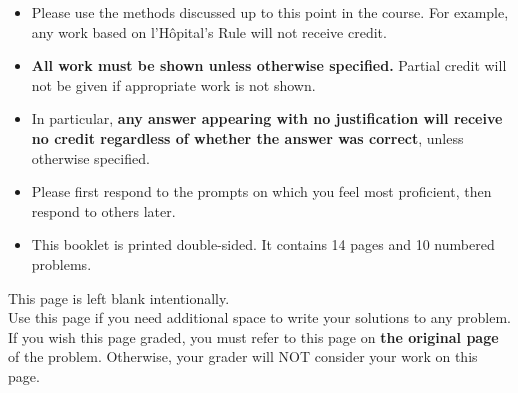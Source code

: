 \documentclass[11pt]{article}
\begin{document}
{\begin{itemize}
    \item Please use the methods discussed up to this point in the course. For example, any work based on l'H\^opital's Rule will not receive credit.
    \item \textbf{All work must be shown unless otherwise specified.} Partial credit will not be given if appropriate work is not shown.
    \item In particular, {\bf any answer appearing with no justification will receive no credit regardless of whether the answer was correct}, unless otherwise specified.
    \item Please first respond to the prompts on which you feel most proficient, then respond to others later.
    \item This booklet is printed double-sided. It contains 14 pages and 10 numbered problems.
    \end{itemize}
    
    }

\vfill



\newpage

This page is left blank intentionally.\\

Use this page if you need additional space to write your solutions to any problem. \\

If you wish this page graded, you must refer to this page on \textbf{the original page} of the problem. Otherwise, your grader will NOT consider your work on this page.

\newpage%
\end{document}
